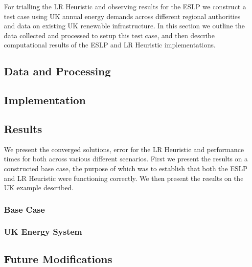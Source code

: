 For trialling the LR Heuristic and observing results for the ESLP we construct 
a test case using UK annual energy demands across different regional authorities
and data on existing UK renewable infrastructure. In this section we outline 
the data collected and processed to setup this test case,
and then describe computational results of the ESLP and LR Heuristic implementations.

\subsection{Data and Processing}\label{sec:data_and_processing}


\subsection{Implementation}\label{sec:implemenation}


\subsection{Results}
We present the converged solutions, error for the LR Heuristic and performance times for both 
across various different scenarios.
First we present the results on a constructed base case, the purpose of which was to establish that
both the ESLP and LR Heuristic were functioning correctly. We then present 
the results on the UK example described. 

\subsubsection{Base Case}


\subsubsection{UK Energy System}


\subsection{Future Modifications}\label{sec:future_modifications}





